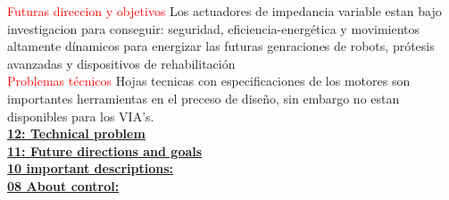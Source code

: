 \documentclass[10pt,onecolumn,twoside,letterpaper]{article}
\begin{document}
\textcolor{red}{Futuras direccion y objetivos} Los actuadores de impedancia variable estan bajo investigacion para conseguir: seguridad, eficiencia-energ\'etica y movimientos altamente d\'inamicos  para energizar las futuras genraciones de robots, pr\'otesis avanzadas y dispositivos de rehabilitaci\'on\cite{Vanderborght2013}\\
\textcolor{red}{Problemas t\'ecnicos} Hojas tecnicas con especificaciones de los motores son importantes herramientas en el preceso de dise\~no, sin embargo no estan disponibles para los VIA's.\cite{Vanderborght2013}\\
\href{run:/:home/jackmaster/Downloads/[2013 B Vanderborght] Art Variable Impedance Actuators: A review.pdf:pdf}{
\textbf{12: Technical problem}\\
\textbf{11: Future directions and goals}\\
\textbf{10 important descriptions:}\\
\textbf{08 About control:}\\ %
}
\end{document}
